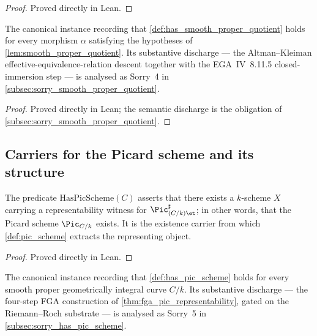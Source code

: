 \begin{proof}

\leanok
  Proved directly in Lean.
\end{proof}

\begin{definition}
  \label{def:inst_has_smooth_proper_quotient}
  The canonical instance recording that \cref{def:has_smooth_proper_quotient}
  holds for every morphism \(\alpha\) satisfying the hypotheses of
  \cref{lem:smooth_proper_quotient}. Its substantive discharge --- the
  Altman--Kleiman effective-equivalence-relation descent together with the
  EGA~IV~8.11.5 closed-immersion step --- is analysed as Sorry~4 in
  \cref{subsec:sorry_smooth_proper_quotient}.
\end{definition}

\begin{proof}
  Proved directly in Lean; the semantic discharge is the obligation of
  \cref{subsec:sorry_smooth_proper_quotient}.
\end{proof}

\subsection{Carriers for the Picard scheme and its structure}
\label{subsec:fga_pic_scheme_carriers}

\begin{definition}
  \label{def:has_pic_scheme}
  The predicate \(\mathrm{HasPicScheme}(C)\) asserts that there exists a \(k\)-scheme
  \(X\) carrying a representability witness for \(\Pic^\sharp_{(C/k)\et}\); in
  other words, that the Picard scheme \(\Pic_{C/k}\) exists. It is the
  existence carrier from which \cref{def:pic_scheme} extracts the representing
  object.
\end{definition}

\begin{proof}
  Proved directly in Lean.
\end{proof}

\begin{definition}
  \label{def:inst_has_pic_scheme}
  The canonical instance recording that \cref{def:has_pic_scheme} holds for
  every smooth proper geometrically integral curve \(C/k\). Its substantive
  discharge --- the four-step FGA construction of
  \cref{thm:fga_pic_representability}, gated on the Riemann--Roch substrate ---
  is analysed as Sorry~5 in \cref{subsec:sorry_has_pic_scheme}.
\end{definition}

